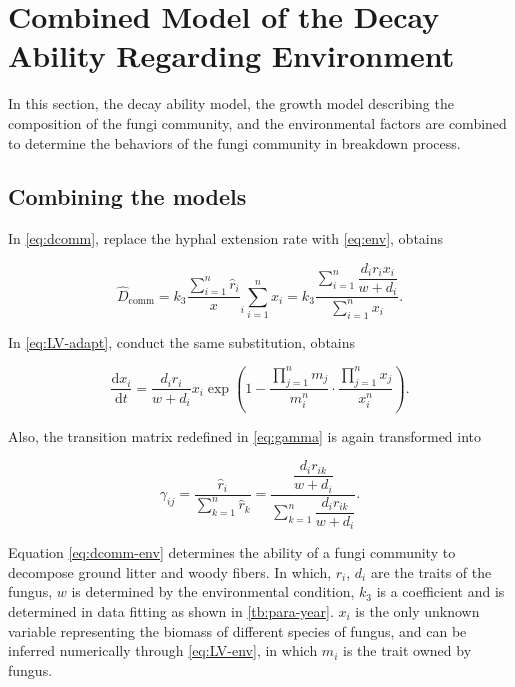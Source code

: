 \section{Combined Model of the Decay Ability Regarding Environment}\label{sec:com}

In this section, the decay ability model, the growth model describing the composition of the fungi community, and the environmental factors are combined to determine the behaviors of the fungi community in breakdown process.

\subsection{Combining the models}

In \eqref{eq:dcomm}, replace the hyphal extension rate with \eqref{eq:env}, obtains

\begin{equation}\label{eq:dcomm-env}
\hat{D}_\text{comm} =
    k_3\frac{\sum_{i=1}^n \hat{r}_i}x_i{\sum_{i=1}^n x_i} =
    k_3\dfrac{\sum\limits_{i=1}^n \dfrac{d_ir_ix_i}
    {w + d_i}}{\sum\limits_{i=1}^n x_i}.
\end{equation}

In \eqref{eq:LV-adapt}, conduct the same substitution, obtains

\begin{equation}\label{eq:LV-env}
    \frac{\mathrm{d}x_i}{\mathrm{d}t} =
    \frac{d_ir_i}{w + d_i}x_i\exp\left(
            1 - \frac{\prod_{j=1}^n m_j}{m_i^n}\cdot
            \frac{\prod_{j=1}^n x_j}{x_i^n}
        \right).
\end{equation}

Also, the transition matrix redefined in \eqref{eq:gamma} is again transformed into

\begin{equation}\label{eq:markov-env}
    \gamma_{ij} = 
    \frac{\hat{r}_i}{\sum_{k=1}^n \hat{r}_k} =
    \frac{\dfrac{d_ir_{ik}}{w + d_i}}
    {\sum\limits_{k=1}^n \dfrac{d_ir_{ik}}{w + d_i}}.
\end{equation}


Equation \eqref{eq:dcomm-env} determines the ability of a fungi community to decompose ground litter and woody fibers. In which, $r_i$, $d_i$ are the traits of the fungus, $w$ is determined by the environmental condition, $k_3$ is a coefficient and is determined in data fitting as shown in \ref{tb:para-year}. $x_i$ is the only unknown variable representing the biomass of different species of fungus, and can be inferred numerically through \eqref{eq:LV-env}, in which $m_i$ is the trait owned by fungus.



